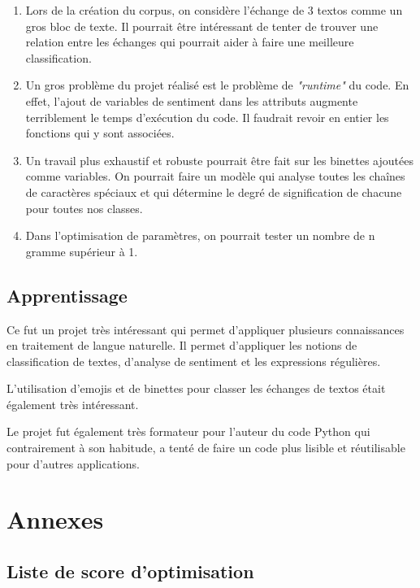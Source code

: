 \documentclass[12pt,french]{article}
\begin{document}
\begin{enumerate}
\item Lors de la création du corpus, on considère l'échange de 3 textos comme un gros bloc de texte. Il pourrait être intéressant de tenter de trouver une relation entre les échanges qui pourrait aider à faire une meilleure classification.

\item Un gros problème du projet réalisé est le problème de \emph{"runtime"} du code. En effet, l'ajout de variables de sentiment dans les attributs augmente terriblement le temps d'exécution du code. Il faudrait revoir en entier les fonctions qui y sont associées.

\item Un travail plus exhaustif et robuste pourrait être fait sur les binettes ajoutées comme variables. On pourrait faire un modèle qui analyse toutes les chaînes de caractères spéciaux et qui détermine le degré de signification de chacune pour toutes nos classes.

\item Dans l'optimisation de paramètres, on pourrait tester un nombre de n gramme supérieur à 1.
\end{enumerate}

\subsection*{Apprentissage}
Ce fut un projet très intéressant qui permet d'appliquer plusieurs connaissances en traitement de langue naturelle. Il permet d'appliquer les notions de classification de textes, d'analyse de sentiment et les expressions régulières.

L'utilisation d'emojis et de binettes pour classer les échanges de textos était également très intéressant.

Le projet fut également très formateur pour l'auteur du code Python qui contrairement à son habitude, a tenté de faire un code plus lisible et réutilisable pour d'autres applications. 




\section*{Annexes}
\subsection*{Liste de score d'optimisation}
\end{document}
